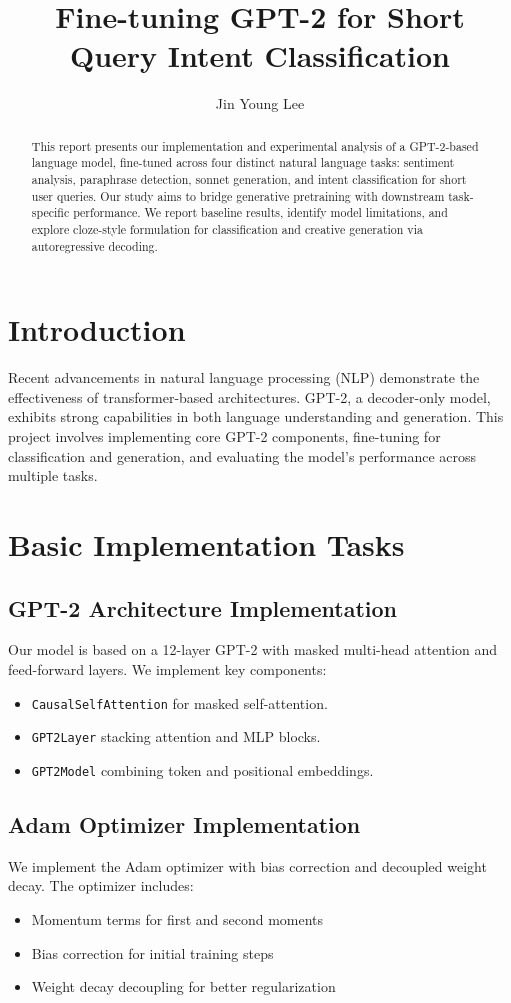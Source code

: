 \documentclass{article}
\title{Fine-tuning GPT-2 for Short Query Intent Classification}
\author{Jin Young Lee}
\begin{document}
\maketitle

\begin{abstract}
This report presents our implementation and experimental analysis of a GPT-2-based language model, fine-tuned across four distinct natural language tasks: sentiment analysis, paraphrase detection, sonnet generation, and intent classification for short user queries. Our study aims to bridge generative pretraining with downstream task-specific performance. We report baseline results, identify model limitations, and explore cloze-style formulation for classification and creative generation via autoregressive decoding.
\end{abstract}

\section{Introduction}
Recent advancements in natural language processing (NLP) demonstrate the effectiveness of transformer-based architectures. GPT-2, a decoder-only model, exhibits strong capabilities in both language understanding and generation. This project involves implementing core GPT-2 components, fine-tuning for classification and generation, and evaluating the model's performance across multiple tasks.

\section{Basic Implementation Tasks}
\subsection{GPT-2 Architecture Implementation}
Our model is based on a 12-layer GPT-2 with masked multi-head attention and feed-forward layers. We implement key components:
\begin{itemize}
\item \texttt{CausalSelfAttention} for masked self-attention.
\item \texttt{GPT2Layer} stacking attention and MLP blocks.
\item \texttt{GPT2Model} combining token and positional embeddings.
\end{itemize}

\subsection{Adam Optimizer Implementation}
We implement the Adam optimizer with bias correction and decoupled weight decay. The optimizer includes:
\begin{itemize}
\item Momentum terms for first and second moments
\item Bias correction for initial training steps
\item Weight decay decoupling for better regularization
\end{itemize}
\end{document}
